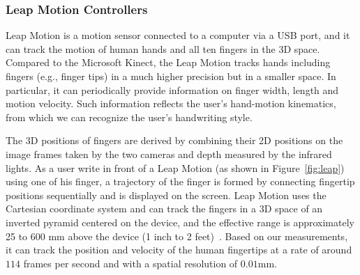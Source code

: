 




\subsubsection{Leap Motion Controllers}

Leap Motion is a motion sensor connected to a computer via a USB port, and it can track the motion of human hands and all ten fingers in the 3D space. Compared to the Microsoft Kinect, the Leap Motion tracks hands including fingers (e.g., finger tips) in a much higher precision but in a smaller space. 
In particular, it can periodically provide
information on finger width, length and motion velocity.   
Such information reflects the user's hand-motion kinematics, from which we can 
recognize the user's handwriting style.

 The 3D positions of fingers are derived by combining their 2D positions on the image frames taken by the two cameras and depth measured by the infrared lights. 
As a user write in front of a Leap Motion (as shown in Figure~\ref{fig:leap}) using one of his finger, %
a trajectory of the finger is formed by connecting fingertip positions sequentially and is displayed on the screen.
Leap Motion uses the Cartesian coordinate system and can track the fingers in a 3D space of an inverted pyramid centered on the device, and the effective range is approximately 25 to 600 mm above the device (1 inch to 2 feet)~\cite{LeapOnlineOverview,leapBlog}.
Based on our measurements, it can track the position and velocity of the human fingertips at a rate of around $114$ frames per second and with a spatial resolution of $0.01$mm.

